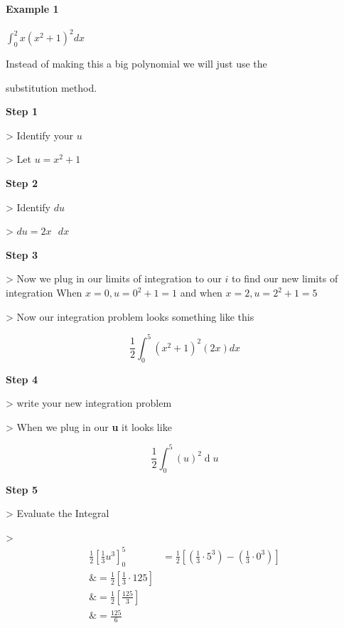 \paragraph{Example 1}



$\int _{0}^{2} x(x^2+1)^2 dx$



Instead of making this a big polynomial we will just use the

substitution method.



\textbf{Step 1}



> Identify your $u$



> Let $u = x^2+1$



\textbf{Step 2}



> Identify $du$



> $du=2x \text{ } dx$



\textbf{Step 3}



> Now we plug in our limits of integration to our $i$ to find our new limits of integration When $x = 0, u =0^2 + 1 = 1$ and when $x = 2, u = 2^2 + 1 = 5$



> Now our integration problem looks something like this



$$\frac{1}{2} \int _{0}^{5} (x^2 + 1)^2 (2x)dx$$





\textbf{Step 4}



> write your new integration problem



> When we plug in our \textbf{u} it looks like



$$\frac {1}{2} \int _{0}^{5} (u)^2 \operatorname {d}u$$



\textbf{Step 5}



> Evaluate the Integral

> \begin{align}
\frac{1}{2} \left[\frac{1}{3} u^3 \right] _{0}^{5} 

&= \frac{1}{2} \left[\left(\frac{1}{3} \cdot 5^3 \right) - \left(\frac{1}{3} \cdot 0^3 \right)\right] \\\&= \frac{1}{2} \left[\frac{1}{3} \cdot 125 \right] \\\&= \frac{1}{2} \left[\frac{125}{3}\right] \\\&= \frac{125}{6}
\end{align}





